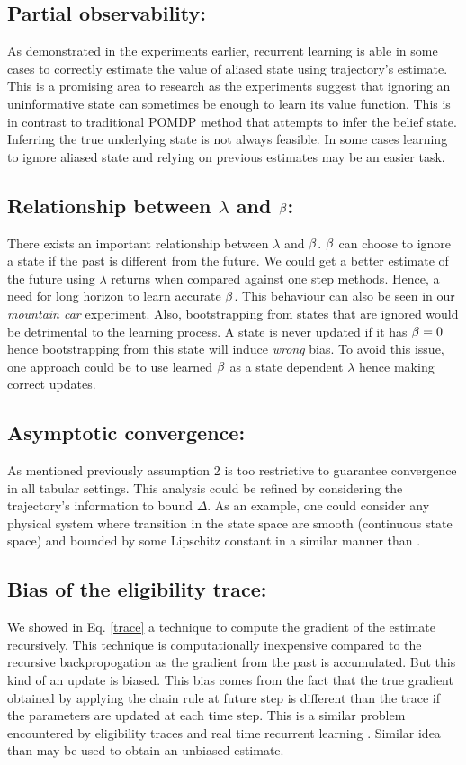 \subsection{Partial observability:} As demonstrated in the experiments earlier, recurrent learning is able in some cases to correctly estimate the value of aliased state using trajectory's estimate. This is a promising area to research as the experiments suggest that ignoring an uninformative state can sometimes be enough to learn its value function. This is in contrast to traditional POMDP method that attempts to infer the belief state. Inferring the true underlying state is not always feasible. In some cases learning to ignore aliased state and relying on previous estimates may be an easier task.
\subsection{Relationship between $\lambda$ and $\beta$:} There exists an important relationship between $\lambda$ and $\beta$. $\beta$ can choose to ignore a state if the past is different from the future. We could get a better estimate of the future using $\lambda$ returns when compared against one step methods. Hence, a need for long horizon to learn accurate $\beta$. This behaviour can also be seen in our \emph{mountain car} experiment. Also, bootstrapping from states that are ignored would be detrimental to the learning process. A state is never updated if it has $\beta=0$ hence bootstrapping from this state will induce \emph{wrong} bias. To avoid this issue, one approach could be to use learned $\beta$ as a state dependent $\lambda$ hence making correct updates.
\subsection{Asymptotic convergence:} As mentioned previously assumption 2 is too restrictive to guarantee convergence in all tabular settings. This analysis could be refined by considering the trajectory's information to bound $\Delta$. As an example, one could consider any physical system where transition in the state space are smooth (continuous state space) and bounded by some Lipschitz constant in a similar manner than \cite{shah2018q}. 
\subsection{Bias of the eligibility trace:}
We showed in Eq. \eqref{trace} a technique to compute the gradient of the estimate recursively. This technique is computationally inexpensive compared to the recursive backpropogation as the gradient from the past is accumulated. But this kind of an update is biased. This bias comes from the fact that the true gradient obtained by applying the chain rule at future step is different than the trace if the parameters are updated at each time step. This is a similar problem encountered by eligibility traces \cite{seijen2014true} and real time recurrent learning \cite{williams1995gradient}. Similar idea than \cite{seijen2014true} may be used to obtain an unbiased estimate.
